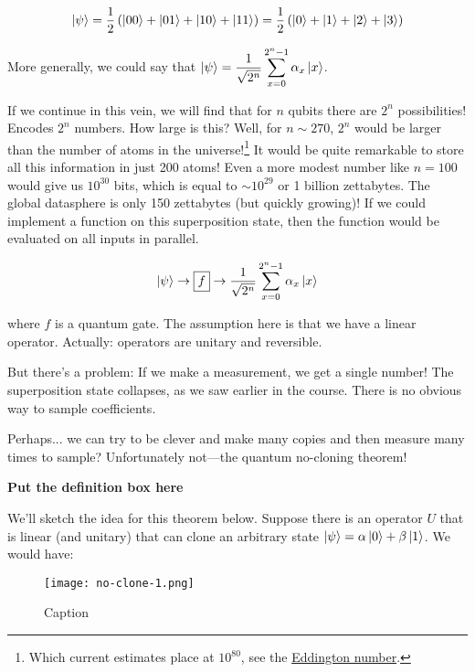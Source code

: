 \documentclass[12pt, english]{book}
\begin{document}
\begin{equation*}
	\ket{\psi} = \frac{1}{2} \left( \ket{00} + \ket{01} + \ket{10} + \ket{11} \right) = \frac{1}{2} \left( \ket{0} + \ket{1} + \ket{2} + \ket{3} \right)
\end{equation*}

More generally, we could say that $\ket{\psi} = \dfrac{1}{\sqrt{2^n}} \displaystyle\sum_{x=0}^{2^n-1} \alpha_x \ket{x}$.

If we continue in this vein, we will find that for $n$ qubits there are $2^n$ possibilities!
Encodes $2^n$ numbers. 
How large is this? 
Well, for $n \sim 270$, $2^n$ would be larger than the number of atoms in the universe!\footnote{Which current estimates place at $10^{80}$, see the \href{https://en.wikipedia.org/wiki/Eddington_number}{Eddington number}.}
It would be quite remarkable to store all this information in just 200 atoms!
Even a more modest number like $n = 100$ would give us $10^{30}$ bits, which is equal to $\sim 10^{29}$ or 1 billion zettabytes. 
The global datasphere is only 150 zettabytes (but quickly growing)!
If we could implement a function on this superposition state, then the function would be evaluated on all inputs in parallel.

\begin{equation*}
	\ket{\psi} \rightarrow \boxed{f} \rightarrow \dfrac{1}{\sqrt{2^n}} \sum_{x=0}^{2^n-1} \alpha_x \ket{x}
\end{equation*}

where $f$ is a quantum gate.
The assumption here is that we have a linear operator. 
Actually: operators are unitary and reversible.

But there's a problem: If we make a measurement, we get a single number!
The superposition state collapses, as we saw earlier in the course.
There is no obvious way to sample coefficients.

Perhaps... we can try to be clever and make many copies and then measure many times to sample?
Unfortunately not---the quantum no-cloning theorem!

\textbf{Put the definition box here}

We'll sketch the idea for this theorem below.
Suppose there is an operator $U$ that is linear (and unitary) that can clone an arbitrary state $\ket{\psi} = \alpha \ket{0} + \beta \ket{1}$.
We would have:

\begin{figure}[!ht]
	\centering
	\texttt{[image: no-clone-1.png]}
	\caption{Caption}
	\label{fig:no-clone-1}
\end{figure}
\end{document}
